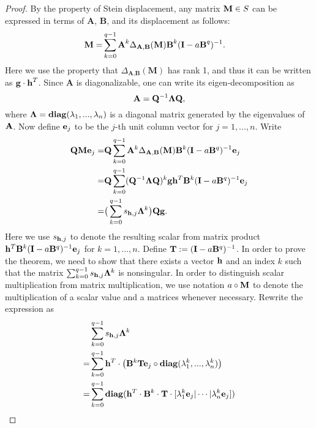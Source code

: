 \documentclass{article}
\begin{document}
\begin{proof}
By the property of Stein displacement, any matrix ${\bf M}\in S$ can be expressed in terms of $\textbf{A}$, $\textbf{B}$, and its displacement as follows:
\begin{equation}
\label{estein}
\aligned
\textbf{M}
=& \sum_{k=0}^{q-1}\textbf{A}^k\Delta_{\textbf{A},\textbf{B}}(\textbf{M})\textbf{B}^k(\textbf{I} - a\textbf{B}^q)^{-1}.
\endaligned
\end{equation}
Here we use the property that $\Delta_{\textbf{A},\textbf{B}}(\textbf{M})$ has rank 1, and thus it can be written as ${\bf g\cdot h}^T$. Since $\textbf{A}$ is diagonalizable, one can write its eigen-decomposition as
\begin{equation}
\label{ea}
{\bf A} = {\bf Q}^{-1}{\bf \Lambda Q},
\end{equation}
where ${\bf\Lambda}={\bf diag}(\lambda_1,...,\lambda_n)$ is a diagonal matrix generated by the eigenvalues of ${\bf A}$.
Now define ${\bf e}_j$ to be the $j$-th unit column vector for $j=1,...,n$. Write
\begin{equation}
\label{emtd}
\aligned
{\bf QM}{\bf e}_j
=& {\bf Q}\sum_{k=0}^{q-1}{\bf A}^k\Delta_{{\bf A},{\bf B}}({\bf M}){\bf B}^k({\bf I} - a{\bf B}^q)^{-1}{\bf e}_j\\
 =& {\bf Q}\sum_{k=0}^{q-1}({\bf Q}^{-1}{\bf \Lambda Q})^k{\bf g} {\bf h}^T{\bf B}^k({\bf I} - a{\bf B}^q)^{-1}{\bf e}_j\\
=& \big(\sum_{k=0}^{q-1}s_{{\bf h}, j}{\bf \Lambda}^k\big){\bf Q}{\bf g}.
\endaligned
\end{equation}
Here we use $s_{{\bf h}, j}$ to denote the resulting scalar from matrix product ${\bf h}^T{\bf B}^k({\bf I} - a{\bf B}^q)^{-1}{\bf e}_j$ for $k=1,...,n$. Define ${\bf T}:=({\bf I} - a{\bf B}^q)^{-1}$. In order to prove the theorem, we need to show that there exists a vector ${\bf h}$ and an index $k$ such that the matrix $\sum_{k=0}^{q-1}s_{{\bf h}, j}{\bf \Lambda}^k$ is nonsingular.
In order to distinguish scalar multiplication from matrix multiplication, we use notation $a\circ {\bf M}$ to denote the multiplication of a scalar value and a matrices whenever necessary. Rewrite the expression as
\begin{align*}
&\sum_{k=0}^{q-1}s_{{\bf h}, j}{\bf \Lambda}^k\\
=& \sum_{k=0}^{q-1}{\bf h}^T\cdot \big({\bf B}^k{\bf T}{\bf e}_j\circ {\bf diag}(\lambda_1^k,...,\lambda_n^k)\big)\\
=& \sum_{k=0}^{q-1}{\bf diag}({\bf h}^T\cdot {\bf B}^k\cdot{\bf T}\cdot [\lambda_1^k{\bf e}_j|\cdots|\lambda_n^k{\bf e}_j])\\

\end{align*}
\end{proof}
\end{document}
